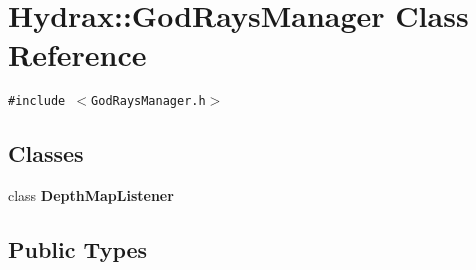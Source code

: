 \hypertarget{class_hydrax_1_1_god_rays_manager}{
\section{Hydrax::GodRaysManager Class Reference}
\label{class_hydrax_1_1_god_rays_manager}
}
{\tt \#include $<$GodRaysManager.h$>$}

\subsection*{Classes}
\begin{CompactItemize}
\item 
class \textbf{DepthMapListener}
\end{CompactItemize}
\subsection*{Public Types}
